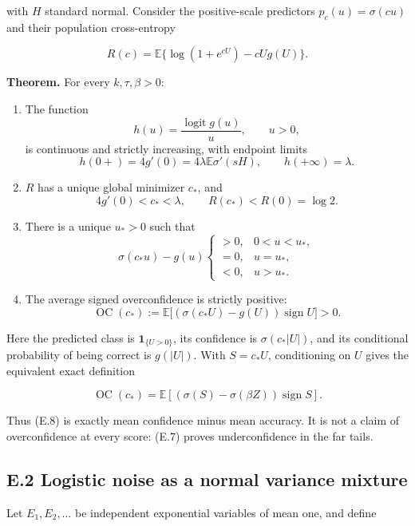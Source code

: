 \documentclass[
  11pt,
  a4paper,
]{article}
\providecommand{\tightlist}{%
  \setlength{\itemsep}{0pt}\setlength{\parskip}{0pt}}
\begin{document}
with \(H\) standard normal. Consider the positive-scale predictors
\(p_c(u)=\sigma(cu)\) and their population cross-entropy

\[
R(c)=\mathbb E\{\log(1+e^{cU})-cU g(U)\}.
\tag{E.3}
\]

\textbf{Theorem.} For every \(k,\tau,\beta>0\):

\begin{enumerate}
\def\labelenumi{\arabic{enumi}.}
\tightlist
\item
  The function \[
  h(u)=\frac{\operatorname{logit}g(u)}u,\qquad u>0,
  \tag{E.4}
  \] is continuous and strictly increasing, with endpoint limits \[
  h(0+)=4g'(0)=4\lambda\mathbb E\sigma'(sH),
  \qquad h(+\infty)=\lambda.
  \tag{E.5}
  \]
\item
  \(R\) has a unique global minimizer \(c_*\), and \[
  4g'(0)<c_*<\lambda,\qquad R(c_*)<R(0)=\log2.
  \tag{E.6}
  \]
\item
  There is a unique \(u_*>0\) such that \[
  \sigma(c_*u)-g(u)
  \begin{cases}>0,&0<u<u_*,\\=0,&u=u_*,\\<0,&u>u_*.
  \end{cases}
  \tag{E.7}
  \]
\item
  The average signed overconfidence is strictly positive: \[
  \operatorname{OC}(c_*):=
  \mathbb E\big[(\sigma(c_*U)-g(U))\operatorname{sign}U\big]>0.
  \tag{E.8}
  \]
\end{enumerate}

Here the predicted class is \(\mathbf1_{\{U>0\}}\), its confidence is
\(\sigma(c_*|U|)\), and its conditional probability of being correct is
\(g(|U|)\). With \(S=c_*U\), conditioning on \(U\) gives the equivalent
exact definition

\[
\operatorname{OC}(c_*)=\mathbb E[(\sigma(S)-\sigma(\beta Z))\operatorname{sign}S].
\]

Thus (E.8) is exactly mean confidence minus mean accuracy. It is not a
claim of overconfidence at every score: (E.7) proves underconfidence in
the far tails.

\hypertarget{e.2-logistic-noise-as-a-normal-variance-mixture}{%
\subsection{E.2 Logistic noise as a normal variance
mixture}\label{e.2-logistic-noise-as-a-normal-variance-mixture}}

Let \(E_1,E_2,\ldots\) be independent exponential variables of mean one,
and define
\end{document}
